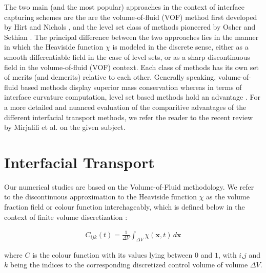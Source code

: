 The two main (and the most popular)
approaches in the context of interface capturing schemes are the 
are the volume-of-fluid (VOF) method first developed by Hirt and Nichols \cite{hirt1981volume}, 
and the level set class of methods pioneered by Osher and Sethian \cite{osher1988fronts}.
The principal difference between the two approaches lies in the manner in which
the Heaviside function $\chi$ is modeled in the discrete sense, 
either as a smooth differentiable field in
the case of level sets, or as a sharp discontinuous field in the volume-of-fluid (VOF) context.  
Each class of methods has its own set of merits (and demerits) relative to each other. 
Generally speaking, volume-of-fluid based methods display superior mass conservation
whereas in terms of interface curvature computation, level set based methods hold an advantage
 . 
For a more detailed and nuanced evaluation of the comparitive advantages of 
the different interfacial transport methods, we refer the reader to the 
recent review by Mirjalili et al. \cite{mirjalili2017interface} on the given subject.     



\section{Interfacial Transport}
Our numerical studies are based on the Volume-of-Fluid methodology. 
We refer to the discontinuous approximation to the Heaviside function
$\chi$ as the volume fraction field or colour function interchageably, which 
is defined below in the context of finite volume discretization : 

\begin{align} 
	C_{ijk}\left(t\right) = \frac{1}{\Delta V} \displaystyle\int_{\Delta V} \chi(\boldsymbol{x},t) \,d\boldsymbol x 
\end{align}

where $C$ is the colour function with its values lying between $0$ and $1$, with $i$,$j$ and $k$ being the indices to the corresponding discretized control volume of volume $\Delta V$.  


